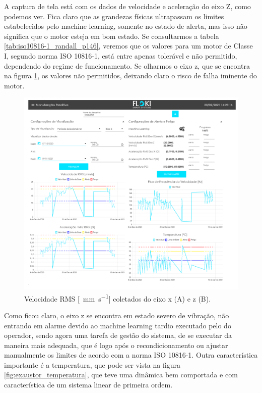 A captura de tela está com os dados de velocidade e aceleração do eixo Z, como podemos ver. Fica claro que as grandezas físicas
ultrapassam os limites estabelecidos pelo machine learning, somente no estado de alerta, mas isso não significa que o motor esteja em bom estado.
Se consultarmos a tabela \ref{tab:iso10816-1_randall_p146}, veremos que os valores para um motor de Classe I, segundo norma  ISO 10816-1, está 
entre apenas tolerável e não permitido, dependendo do regime de funcionamento. 
Se olharmos o eixo z, que se encontra na figura \ref{fig:exaustor_xz}, os valores não permitidos, deixando claro o risco de falha iminente do 
motor.

\begin{figure}[H]
    \caption{Velocidade RMS [\SI{}{\milli\metre\per\second}] coletados do eixo x (A) e z (B).}
    \begin{center}
        \includegraphics[scale=0.65, page=2]{resultados/img/resultados.pdf}
    \end{center}
    \label{fig:exaustor_xz}
\end{figure}

Como ficou claro, o eixo z se encontra em estado severo de vibração, não entrando em alarme devido ao machine learning tardio executado
pelo do operador, sendo agora uma tarefa de gestão do sistema, de se executar da maneira mais adequada, que é logo após o recondicionamento 
ou ajustar manualmente os limites de acordo com a norma ISO 10816-1. Outra característica importante é a temperatura, que pode ser vista na 
figura \ref{fig:exaustor_temperatura}, que teve uma dinâmica bem comportada e com característica de um sistema linear de primeira ordem.


